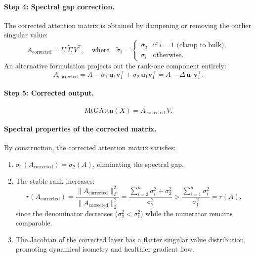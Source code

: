 \documentclass[12pt, a4paper]{article}
\begin{document}
\paragraph{Step 4: Spectral gap correction.}
The corrected attention matrix is obtained by dampening or removing the
outlier singular value:
\begin{equation}
    A_{\text{corrected}} = U\, \tilde{\Sigma}\, V^\top, \quad
    \text{where} \quad
    \tilde{\sigma}_i =
    \begin{cases}
        \sigma_2 & \text{if } i = 1 \text{ (clamp to bulk)}, \\
        \sigma_i & \text{otherwise}.
    \end{cases}
    \label{eq:mtg_correction}
\end{equation}
An alternative formulation projects out the rank-one component entirely:
\begin{equation}
    A_{\text{corrected}} = A - \sigma_1\, \mathbf{u}_1 \mathbf{v}_1^\top
    + \sigma_2\, \mathbf{u}_1 \mathbf{v}_1^\top
    = A - \Delta\, \mathbf{u}_1 \mathbf{v}_1^\top.
    \label{eq:mtg_projection}
\end{equation}

\paragraph{Step 5: Corrected output.}
\begin{equation}
    \text{MtGAttn}(X) = A_{\text{corrected}}\, V.
    \label{eq:mtg_output}
\end{equation}

\paragraph{Spectral properties of the corrected matrix.}
By construction, the corrected attention matrix satisfies:
\begin{enumerate}[label=(\roman*)]
    \item $\sigma_1(A_{\text{corrected}}) = \sigma_2(A)$, eliminating
          the spectral gap.
    \item The stable rank increases:
    \begin{equation}
        r(A_{\text{corrected}}) =
        \frac{\|A_{\text{corrected}}\|_F^2}{\|A_{\text{corrected}}\|_2^2}
        = \frac{\sum_{i=2}^{n} \sigma_i^2 + \sigma_2^2}
               {\sigma_2^2}
        > \frac{\sum_{i=1}^{n} \sigma_i^2}{\sigma_1^2}
        = r(A),
        \label{eq:mtg_stable_rank}
    \end{equation}
    since the denominator decreases ($\sigma_2^2 < \sigma_1^2$) while
    the numerator remains comparable.
    \item The Jacobian of the corrected layer has a flatter singular
          value distribution, promoting dynamical isometry and
          healthier gradient flow.
\end{enumerate}
\end{document}
